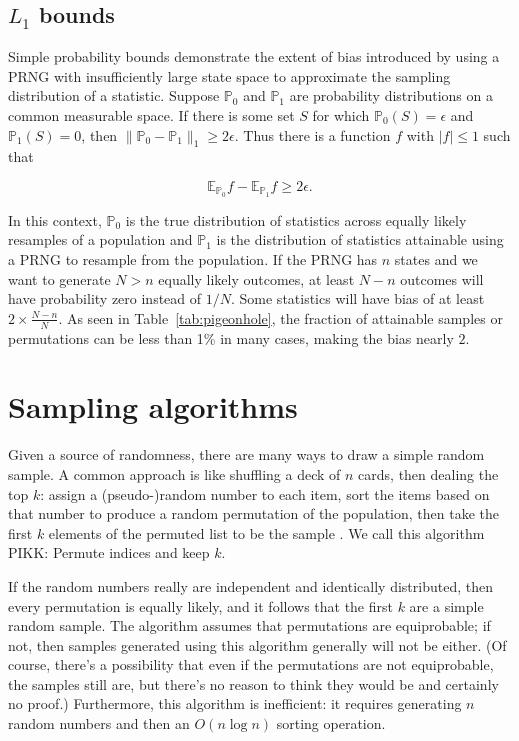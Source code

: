 \documentclass[graybox]{svmult}
\begin{document}
\subsection{$L_1$ bounds}\label{sec:L1bounds}

Simple probability bounds demonstrate the extent of bias introduced by using a PRNG with insufficiently large
state space to approximate the sampling distribution of a statistic.
Suppose ${\mathbb P}_0$ and ${\mathbb P}_1$ are probability distributions on a common measurable space. 
If there is some set $S$ for which ${\mathbb P}_0(S) = \epsilon$ and ${\mathbb P}_1(S) = 0$, then $\|{\mathbb P}_0 - {\mathbb P}_1 \|_1 \ge 2 \epsilon$.
Thus there is a function $f$ with $|f| \le 1$ such that 

$${\mathbb E}_{{\mathbb P}_0}f -  {\mathbb E}_{{\mathbb P}_1}f \ge 2 \epsilon.$$

In this context, ${\mathbb P}_0$ is the true distribution of statistics across equally likely resamples of a population 
and ${\mathbb P}_1$ is the distribution of statistics attainable using a PRNG to resample from the population.
If the PRNG has $n$ states and we want to generate $N>n$ equally likely outcomes, at least $N-n$ outcomes will have probability zero instead of $1/N$.
Some statistics will have bias of at least $2 \times \frac{N-n}{N}$.
As seen in Table~\ref{tab:pigeonhole}, the fraction of attainable samples or permutations can be less than 1\% in many cases, making the bias nearly $2$. 

\section{Sampling algorithms}
\label{sec:algorithms}

Given a source of randomness, there are many ways to draw a simple random sample.
A common approach is like shuffling a deck of $n$ cards, then dealing the top $k$:
assign a (pseudo-)random number to each item, sort the items based on that number
to produce a random permutation of the population, 
then take the first $k$ elements of the permuted list to be the sample
\cite{stine_statistics_2014, leblanc_statistics_2004, dahlberg_practical_2010}.
We call this algorithm PIKK: Permute indices and keep $k$.

If the random numbers really are independent and identically distributed, then every permutation is equally likely, 
and it follows that the first $k$ are a simple random sample.
The algorithm assumes that permutations are equiprobable; if not, then samples generated using this algorithm generally will not be either. 
(Of course, there's a possibility that even if the permutations are not equiprobable, the samples still
are, but there's no reason to think they would be and certainly no proof.)
Furthermore, this algorithm is inefficient: it requires generating $n$ random numbers and then an $O(n\log n)$ sorting operation.
\end{document}
